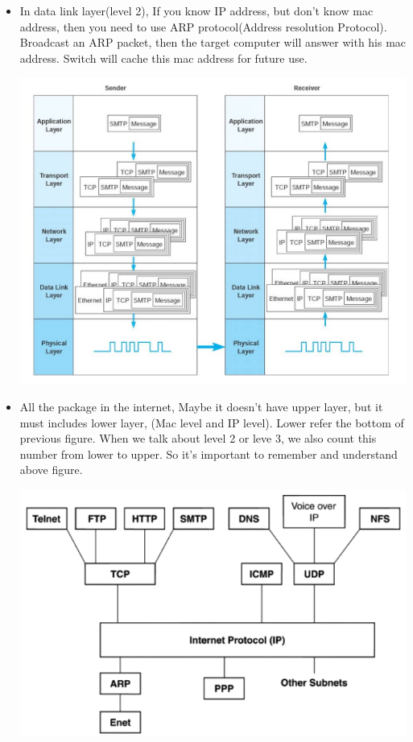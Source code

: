 \documentclass[a4paper,11pt,twoside]{book}
\begin{document}
\begin{itemize}
		\item In data link layer(level 2), If you know IP address, but don't know mac address, then you need to use ARP protocol(Address resolution Protocol). Broadcast an ARP packet, then the target computer will answer with his mac address. Switch will cache this mac address for future use.
		
		\begin{center}
			\includegraphics[width=0.95\linewidth]{pics/it_layer.png}
		\end{center}
		\item All the package in the internet, Maybe it doesn't have upper layer, but it must includes lower layer, (Mac level and IP level). Lower refer the bottom of previous figure. When we talk about level 2 or leve 3, we also count this number from lower to upper. So it's important to remember and understand above figure. 
		
	
\begin{center}
	\includegraphics[width=0.60\linewidth]{pics/protocols.png}	
\end{center}



\end{itemize}
\end{document}
